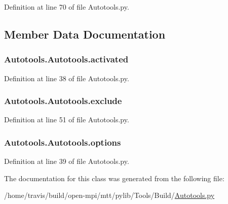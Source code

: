 Definition at line 70 of file Autotools.\-py.



\subsection{Member Data Documentation}
\hypertarget{classAutotools_1_1Autotools_a6bbb714a91bc8b6fe749326772b073b3}{
\subsubsection[{activated}]{\setlength{\rightskip}{0pt plus 5cm}Autotools.\-Autotools.\-activated}}\label{classAutotools_1_1Autotools_a6bbb714a91bc8b6fe749326772b073b3}


Definition at line 38 of file Autotools.\-py.

\hypertarget{classAutotools_1_1Autotools_aee37d9789ea22ee310ebc357cd721b7f}{
\subsubsection[{exclude}]{\setlength{\rightskip}{0pt plus 5cm}Autotools.\-Autotools.\-exclude}}\label{classAutotools_1_1Autotools_aee37d9789ea22ee310ebc357cd721b7f}


Definition at line 51 of file Autotools.\-py.

\hypertarget{classAutotools_1_1Autotools_a8b348e19f0a7104bde9c43c3a6ed695d}{
\subsubsection[{options}]{\setlength{\rightskip}{0pt plus 5cm}Autotools.\-Autotools.\-options}}\label{classAutotools_1_1Autotools_a8b348e19f0a7104bde9c43c3a6ed695d}


Definition at line 39 of file Autotools.\-py.



The documentation for this class was generated from the following file\-:\begin{DoxyCompactItemize}
\item 
/home/travis/build/open-\/mpi/mtt/pylib/\-Tools/\-Build/\hyperlink{Autotools_8py}{Autotools.\-py}\end{DoxyCompactItemize}
